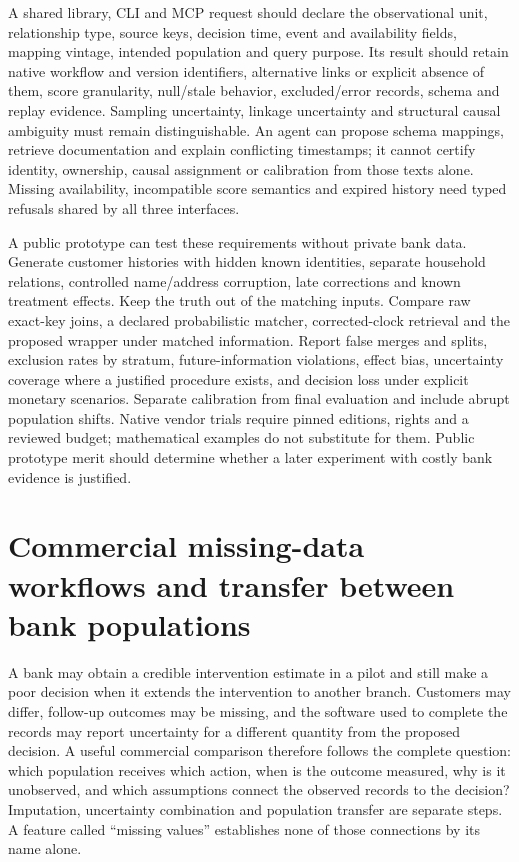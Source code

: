 A shared library, CLI and MCP request should declare the observational unit,
relationship type, source keys, decision time, event and availability fields,
mapping vintage, intended population and query purpose. Its result should retain
native workflow and version identifiers, alternative links or explicit absence of
them, score granularity, null/stale behavior, excluded/error records, schema and
replay evidence. Sampling uncertainty, linkage uncertainty and structural causal
ambiguity must remain distinguishable. An agent can propose schema mappings,
retrieve documentation and explain conflicting timestamps; it cannot certify
identity, ownership, causal assignment or calibration from those texts alone.
Missing availability, incompatible score semantics and expired history need typed
refusals shared by all three interfaces.

A public prototype can test these requirements without private bank data. Generate
customer histories with hidden known identities, separate household relations,
controlled name/address corruption, late corrections and known treatment effects.
Keep the truth out of the matching inputs. Compare raw exact-key joins, a declared
probabilistic matcher, corrected-clock retrieval and the proposed wrapper under
matched information. Report false merges and splits, exclusion rates by stratum,
future-information violations, effect bias, uncertainty coverage where a justified
procedure exists, and decision loss under explicit monetary scenarios. Separate
calibration from final evaluation and include abrupt population shifts. Native
vendor trials require pinned editions, rights and a reviewed budget; mathematical
examples do not substitute for them. Public prototype merit should determine
whether a later experiment with costly bank evidence is justified.


\section{Commercial missing-data workflows and transfer between bank populations}
\label{exec21:transport-scope}

A bank may obtain a credible intervention estimate in a pilot and still make a
poor decision when it extends the intervention to another branch. Customers may
differ, follow-up outcomes may be missing, and the software used to complete
the records may report uncertainty for a different quantity from the proposed
decision. A useful commercial comparison therefore follows the complete
question: which population receives which action, when is the outcome measured,
why is it unobserved, and which assumptions connect the observed records to the
decision? Imputation, uncertainty combination and population transfer are
separate steps. A feature called ``missing values'' establishes none of those
connections by its name alone.

